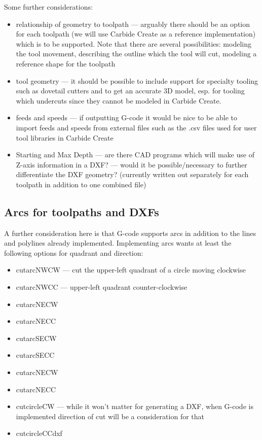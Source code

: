 \documentclass{ltxdoc}
\begin{document}
Some further considerations:

\begin{itemize}
 \item relationship of geometry to toolpath --- arguably there should be an option for each
       toolpath (we will use Carbide Create as a reference implementation) which is to be 
       supported. Note that there are several possibilities: modeling the tool movement,
       describing the outline which the tool will cut, modeling a reference shape for the toolpath
 \item tool geometry --- it should be possible to include support for specialty tooling 
       such as dovetail cutters and to get an accurate 3D model, esp. for tooling which
       undercuts since they cannot be modeled in Carbide Create.
 \item feeds and speeds --- if outputting G-code it would be nice to be able to import feeds 
       and speeds from external files such as the .csv files used for user tool libraries in
       Carbide Create
 \item Starting and Max Depth --- are there CAD programs which will make use of Z-axis information 
       in a DXF? --- would it be possible/necessary to further differentiate the DXF geometry?
       (currently  written out separately for each toolpath in addition to one combined file)
\end{itemize}

\subsection{Arcs for toolpaths and DXFs}
 
A further consideration here is that G-code supports arcs in addition to the lines and
polylines already implemented. Implementing arcs wants at least the following options 
for quadrant and direction:
 
\begin{itemize}
\item cutarcNWCW --- cut the upper-left quadrant of a circle moving clockwise
\item cutarcNWCC --- upper-left quadrant counter-clockwise
\item cutarcNECW
\item cutarcNECC
\item cutarcSECW
\item cutarcSECC
\item cutarcNECW
\item cutarcNECC
\item cutcircleCW --- while it won’t matter for generating a DXF, when G-code is implemented
                      direction of cut will be a consideration for that
\item cutcircleCCdxf
\end{itemize}
 
\end{document}

